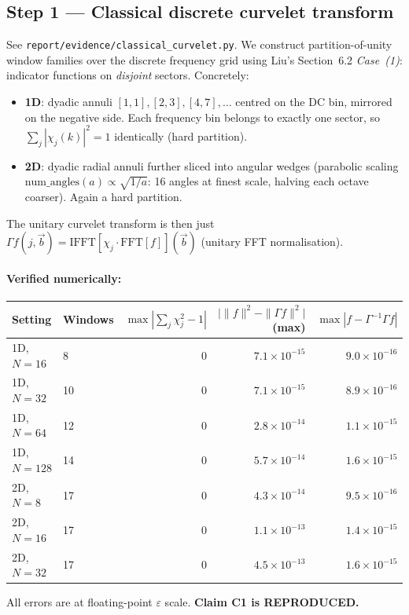 \documentclass[11pt]{article}
\begin{document}
\subsection{Step 1 --- Classical discrete curvelet transform}
See \texttt{report/evidence/classical\_curvelet.py}. We construct partition-of-unity window families over the discrete frequency grid using Liu's Section~6.2 \emph{Case~(1)}: indicator functions on \emph{disjoint} sectors. Concretely:
\begin{itemize}
  \item \textbf{1D}: dyadic annuli $[1,1], [2,3], [4,7], \ldots$ centred on the DC bin, mirrored on the negative side. Each frequency bin belongs to exactly one sector, so $\sum_j |\chi_j(k)|^2 = 1$ identically (hard partition).
  \item \textbf{2D}: dyadic radial annuli further sliced into angular wedges (parabolic scaling $\text{num\_angles}(a) \propto \sqrt{1/a}$: 16 angles at finest scale, halving each octave coarser). Again a hard partition.
\end{itemize}
The unitary curvelet transform is then just $\Gamma f(j, \vec b) = \text{IFFT}[\chi_j \cdot \text{FFT}[f]](\vec b)$ (unitary FFT normalisation).

\paragraph{Verified numerically:}
\begin{center}
\begin{tabular}{llrrr}
\toprule
Setting & Windows & $\max|\sum_j \chi_j^2 - 1|$ & $\big| \|f\|^2 - \|\Gamma f\|^2 \big|$ (max) & $\max|f - \Gamma^{-1}\Gamma f|$ \\
\midrule
1D, $N=16$   &  8 & $0$ & $7.1\times 10^{-15}$ & $9.0\times 10^{-16}$ \\
1D, $N=32$   & 10 & $0$ & $7.1\times 10^{-15}$ & $8.9\times 10^{-16}$ \\
1D, $N=64$   & 12 & $0$ & $2.8\times 10^{-14}$ & $1.1\times 10^{-15}$ \\
1D, $N=128$  & 14 & $0$ & $5.7\times 10^{-14}$ & $1.6\times 10^{-15}$ \\
2D, $N=8$    & 17 & $0$ & $4.3\times 10^{-14}$ & $9.5\times 10^{-16}$ \\
2D, $N=16$   & 17 & $0$ & $1.1\times 10^{-13}$ & $1.4\times 10^{-15}$ \\
2D, $N=32$   & 17 & $0$ & $4.5\times 10^{-13}$ & $1.6\times 10^{-15}$ \\
\bottomrule
\end{tabular}
\end{center}
All errors are at floating-point $\varepsilon$ scale. \textbf{Claim C1 is REPRODUCED.}
\end{document}
